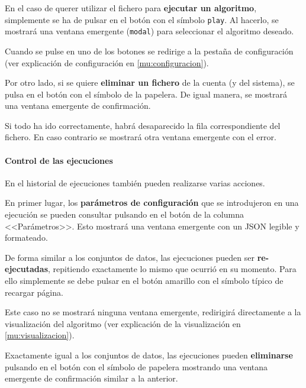 En el caso de querer utilizar el fichero para \textbf{ejecutar un algoritmo},
simplemente se ha de pulsar en el botón con el símbolo \texttt{play}. Al
hacerlo, se mostrará una ventana emergente (\texttt{modal}) para seleccionar el
algoritmo deseado.


Cuando se pulse en uno de los botones se redirige a la pestaña de configuración
(ver explicación de configuración en \ref{mu:configuracion}).

\label{mu:eliminardataset}
Por otro lado, si se quiere \textbf{eliminar un fichero} de la cuenta (y del
sistema), se pulsa en el botón con el símbolo de la papelera. De igual manera,
se mostrará una ventana emergente de confirmación.


Si todo ha ido correctamente, habrá desaparecido la fila correspondiente del
fichero. En caso contrario se mostrará otra ventana emergente con el error.

\paragraph{Control de las ejecuciones} En el historial de ejecuciones también
pueden realizarse varias acciones.

\label{mu:parametrosrun}
En primer lugar, los \textbf{parámetros de configuración} que se introdujeron en
una ejecución se pueden consultar pulsando en el botón de la columna
<<Parámetros>>. Esto mostrará una ventana emergente con un JSON legible y
formateado.


De forma similar a los conjuntos de datos, las ejecuciones pueden ser
\textbf{re-ejecutadas}, repitiendo exactamente lo mismo que ocurrió en su
momento. Para ello simplemente se debe pulsar en el botón amarillo con el
símbolo típico de recargar página.

Este caso no se mostrará ninguna ventana emergente, redirigirá directamente a la
visualización del algoritmo (ver explicación de la visualización en
\ref{mu:visualizacion}).

\label{mu:eliminarrun}
Exactamente igual a los conjuntos de datos, las ejecuciones pueden
\textbf{eliminarse} pulsando en el botón con el símbolo de papelera mostrando
una ventana emergente de confirmación similar a la anterior.

